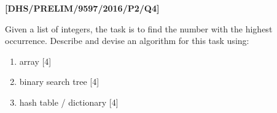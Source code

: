 \item \textbf{{[}DHS/PRELIM/9597/2016/P2/Q4{]} }

Given a list of integers, the task is to find the number with the
highest occurrence. Describe and devise an algorithm for this task
using:
\begin{enumerate}
\item array \hfill{}{[}4{]}
\item binary search tree \hfill{}{[}4{]}
\item hash table / dictionary\hfill{} {[}4{]}
\end{enumerate}